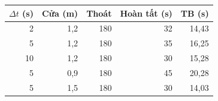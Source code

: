\small\begin{tabular}{rrrrr}
\toprule
$\Delta t$ (s) & Cửa (m) & Thoát & Hoàn tất (s) & TB (s)\\\midrule
2 & 1,2 & 180 & 32 & 14,43\\
5 & 1,2 & 180 & 35 & 16,25\\
10 & 1,2 & 180 & 30 & 15,28\\
5 & 0,9 & 180 & 45 & 20,28\\
5 & 1,5 & 180 & 30 & 14,03\\
\bottomrule\end{tabular}
